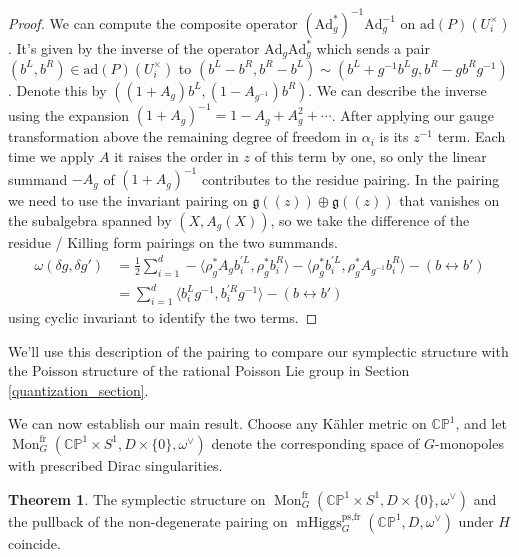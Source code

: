 \documentclass[11pt, oneside, reqno]{amsart}
\theoremstyle{definition} \newtheorem{definition}{Definition}[section]
\newtheorem{theorem}[definition]{Theorem}
\theoremstyle{definition} \newtheorem{remark}[definition]{Remark}
\theoremstyle{definition} \newtheorem{remarks}[definition]{Remarks}
\theoremstyle{definition} \newtheorem{question}[definition]{Question}
\theoremstyle{definition} \newtheorem*{note}{Note}
\theoremstyle{definition} \newtheorem{example}[definition]{Example}
\theoremstyle{definition} \newtheorem{examples}[definition]{Examples}
\renewcommand{\gg}{\mathfrak{g}}
\newcommand{\bb}[1]{\mathbb{#1}}
\newcommand{\mr}[1]{\mathrm{#1}}
\DeclareMathOperator{\mhiggs}{mHiggs}
\DeclareMathOperator{\mon}{Mon}
\newcommand{\fr}{\mathrm{fr}}
\newcommand{\Ad}{\mr{Ad}}
\begin{document}
\begin{proof}
We can compute the composite operator $(\Ad_g^*)^{-1}\Ad_g^{-1}$ on $\mr{ad}(P)(U^\times_i)$.  It's given by the inverse of the operator $\Ad_g\Ad_g^*$ which sends a pair $(b^L, b^R) \in \mr{ad}(P)(U^\times_i)$ to $(b^L - b^R, b^R - b^L) \sim (b^L + g^{-1} b^L g, b^R - g b^R g^{-1})$.  Denote this by $((1+A_g)b^L,(1-A_{g^{-1}})b^R)$.  We can describe the inverse using the expansion $(1+A_g)^{-1} = 1 - A_g + A_g^2 + \cdots$.  After applying our gauge transformation above the remaining degree of freedom in $\alpha_i$ is its $z^{-1}$ term.  Each time we apply $A$ it raises the order in $z$ of this term by one, so only the linear summand $-A_g$ of $(1+A_g)^{-1}$ contributes to the residue pairing.  In the pairing we need to use the invariant pairing on $\gg((z)) \oplus \gg((z))$ that vanishes on the subalgebra spanned by $(X, A_g(X))$, so we take the difference of the residue / Killing form pairings on the two summands.
\begin{align*}
\omega(\delta g, \delta g') &= \frac 12 \sum_{i=1}^d  - \langle \rho_g^*A_g b^{'L}_i, \rho_g^*b^{R}_i \rangle - \langle \rho_g^*b^{'L}_i, \rho_g^*A_{g^{-1}}b^{R}_i \rangle- (b \leftrightarrow b') \\ 
&= \sum_{i=1}^d \langle b^L_ig^{-1}, b^{'R}_i g^{-1} \rangle  - (b \leftrightarrow b')
\end{align*}
using cyclic invariant to identify the two terms. 
\end{proof}

We'll use this description of the pairing to compare our symplectic structure with the Poisson structure of the rational Poisson Lie group in Section \ref{quantization_section}.

We can now establish our main result.  Choose any K\"ahler metric on $\bb{CP}^1$, and let $\mon_G^\fr(\bb{CP}^1 \times S^1,D \times\{0\},\omega^\vee)$ denote the corresponding space of $G$-monopoles with prescribed Dirac singularities. 

\begin{theorem} \label{symplectic_comparison_thm}
The symplectic structure on $\mon_G^\fr(\bb{CP}^1 \times S^1,D \times\{0\},\omega^\vee)$ and the pullback of the non-degenerate pairing on $\mhiggs_G^{\text{ps,fr}}(\bb{CP}^1,D,\omega^\vee)$ under $H$ coincide.
\end{theorem}
\end{document}
